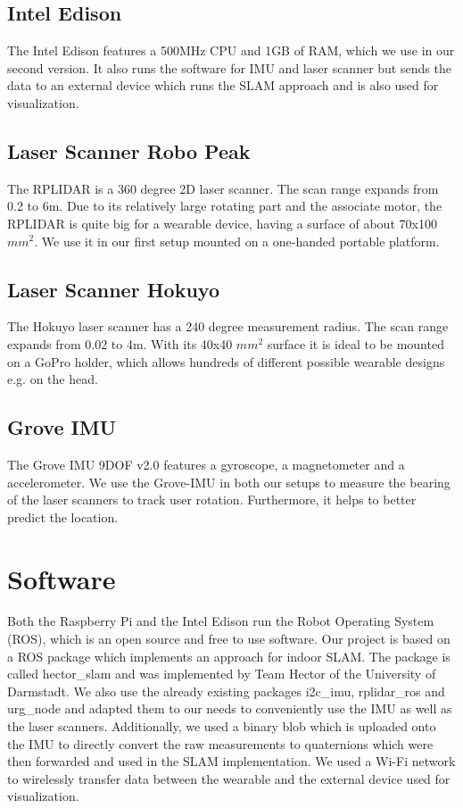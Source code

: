 \documentclass{sigchi-ext}
\begin{document}
\subsection{Intel Edison}
The Intel Edison features a 500MHz CPU and 1GB of RAM, which we use in our second version. It also runs the software for IMU and laser scanner but sends the data to an external device which runs the SLAM approach and is also used for visualization.

\subsection{Laser Scanner Robo Peak}
The RPLIDAR is a 360 degree 2D laser scanner. The scan range expands from 0.2 to 6m. Due to its relatively large rotating part and the associate motor, the RPLIDAR is quite big for a wearable device, having a surface of about 70x100 $mm^2$. We use it in our first setup mounted on a one-handed portable platform.

\subsection{Laser Scanner Hokuyo}
The Hokuyo laser scanner has a 240 degree measurement radius. The scan range expands from 0.02 to 4m. With its 40x40 $mm^2$ surface it is ideal to be mounted on a GoPro holder, which allows hundreds of different possible wearable designs e.g. on the head.

\subsection{Grove IMU}
The Grove IMU 9DOF v2.0 features a gyroscope, a magnetometer and a accelerometer. We use the Grove-IMU in both our setups to measure the bearing of the laser scanners to track user rotation. Furthermore, it helps to better predict the location.

\section{Software}
Both the Raspberry Pi and the Intel Edison run the Robot Operating System (ROS), which is an open source and free to use software. Our project is based on a ROS package which implements an approach for indoor SLAM. The package is called hector\_slam and was implemented by Team Hector of the University of Darmstadt. We also use the already existing packages i2c\_imu, rplidar\_ros and urg\_node and adapted them to our needs to conveniently use the IMU as well as the laser scanners. Additionally, we used a binary blob which is uploaded onto the IMU to directly convert the raw measurements to quaternions which were then forwarded and used in the SLAM implementation. We used a Wi-Fi network to wirelessly transfer data between the wearable and the external device used for visualization. 
\end{document}
